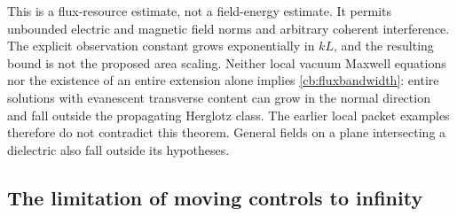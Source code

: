 \begin{remark}
\label{cb:scope}
This is a flux-resource estimate, not a field-energy estimate. It permits
unbounded electric and magnetic field norms and arbitrary coherent
interference. The explicit observation constant grows exponentially in
$kL$, and the resulting bound is not the proposed area scaling.
Neither local vacuum Maxwell equations nor the existence of an entire
extension alone implies \eqref{cb:fluxbandwidth}: entire solutions with
evanescent transverse content can grow in the normal direction and fall
outside the propagating Herglotz class. The earlier local packet examples
therefore do not contradict this theorem. General fields on a plane
intersecting a dielectric also fall outside its hypotheses.
\end{remark}

\subsection{The limitation of moving controls to infinity}

